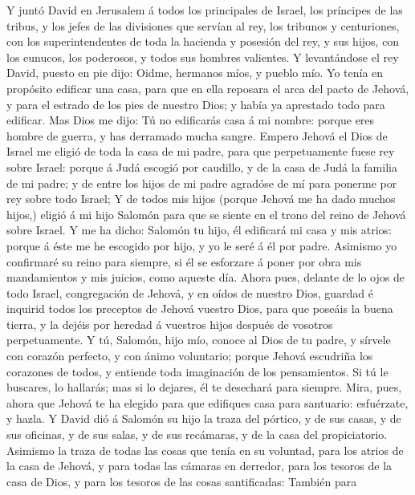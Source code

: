  Y juntó David en Jerusalem á todos los principales de
Israel, los príncipes de las tribus, y los jefes de las divisiones que
servían al rey, los tribunos y centuriones, con los superintendentes de
toda la hacienda y posesión del rey, y sus hijos, con los eunucos, los
poderosos, y todos sus hombres valientes.  Y levantándose el
rey David, puesto en pie dijo: Oidme, hermanos míos, y pueblo mío. Yo
tenía en propósito edificar una casa, para que en ella reposara el arca
del pacto de Jehová, y para el estrado de los pies de nuestro Dios; y
había ya aprestado todo para edificar.  Mas Dios me dijo: Tú
no edificarás casa á mi nombre: porque eres hombre de guerra, y has
derramado mucha sangre.  Empero Jehová el Dios de Israel me
eligió de toda la casa de mi padre, para que perpetuamente fuese rey
sobre Israel: porque á Judá escogió por caudillo, y de la casa de Judá
la familia de mi padre; y de entre los hijos de mi padre agradóse de mí
para ponerme por rey sobre todo Israel;  Y de todos mis
hijos (porque Jehová me ha dado muchos hijos,) eligió á mi hijo Salomón
para que se siente en el trono del reino de Jehová sobre Israel.
 Y me ha dicho: Salomón tu hijo, él edificará mi casa y mis
atrios: porque á éste me he escogido por hijo, y yo le seré á él por
padre.  Asimismo yo confirmaré su reino para siempre, si él
se esforzare á poner por obra mis mandamientos y mis juicios, como
aqueste día.  Ahora pues, delante de lo ojos de todo Israel,
congregación de Jehová, y en oídos de nuestro Dios, guardad é inquirid
todos los preceptos de Jehová vuestro Dios, para que poseáis la buena
tierra, y la dejéis por heredad á vuestros hijos después de vosotros
perpetuamente.  Y tú, Salomón, hijo mío, conoce al Dios de
tu padre, y sírvele con corazón perfecto, y con ánimo voluntario; porque
Jehová escudriña los corazones de todos, y entiende toda imaginación de
los pensamientos. Si tú le buscares, lo hallarás; mas si lo dejares, él
te desechará para siempre.  Mira, pues, ahora que Jehová te
ha elegido para que edifiques casa para santuario: esfuérzate, y hazla.
 Y David dió á Salomón su hijo la traza del pórtico, y de
sus casas, y de sus oficinas, y de sus salas, y de sus recámaras, y de
la casa del propiciatorio.  Asimismo la traza de todas las
cosas que tenía en su voluntad, para los atrios de la casa de Jehová, y
para todas las cámaras en derredor, para los tesoros de la casa de Dios,
y para los tesoros de las cosas santificadas:  También para
